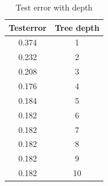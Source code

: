 \documentclass[a4paper]{article}
\begin{document}
\begin{table}[H]
\centering
\caption{Test error with depth}
\begin{tabular}{|c|c|}
	\hline
	Testerror & Tree depth \\
	\hline
	0.374 & 1\\
	\hline
	0.232 &2\\
	\hline
	0.208 &3\\
	\hline
     0.176 &4\\
     \hline
     0.184 & 5\\
     \hline
     0.182& 6\\
     \hline
     0.182& 7\\
     \hline
     0.182 & 8\\
     \hline
     0.182 & 9\\
     \hline
     0.182 & 10\\
	\hline
\end{tabular}
\end{table}
\end{document}
